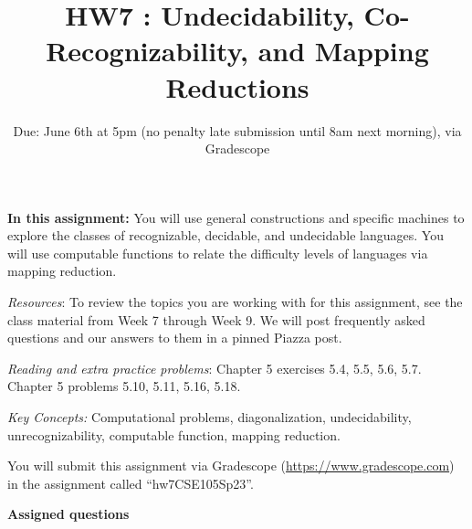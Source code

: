 


\title{HW7 : Undecidability, Co-Recognizability, and Mapping Reductions}
\date{Due: June 6th at 5pm (no penalty late submission until 8am next morning), via Gradescope}


\maketitle
\thispagestyle{fancy}

\textbf{In this assignment:} You will use general constructions and specific machines to 
explore the classes of recognizable, decidable, and undecidable languages.
You will use computable functions to relate the difficulty levels of languages via mapping reduction.


\textit{Resources}: To review the topics you are working with for this assignment, 
see the class material from Week 7 through Week 9. We will post frequently asked questions and our answers to them in a pinned Piazza post.

\textit{Reading and extra practice problems}: Chapter 5 exercises 5.4, 5.5, 5.6, 5.7. 
Chapter 5 problems 5.10, 5.11, 5.16, 5.18.

\textit{Key Concepts:} Computational problems, diagonalization, undecidability, 
unrecognizability, computable function, mapping reduction.

\instructions

You will submit this assignment via Gradescope
(\href{https://www.gradescope.com}{https://www.gradescope.com}) 
in the assignment called ``hw7CSE105Sp23''.

\textbf{Assigned questions}

